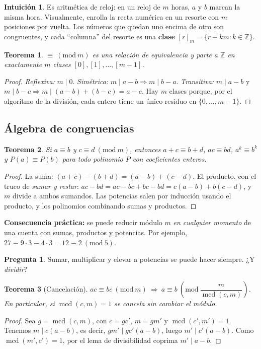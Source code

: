 \documentclass[11pt,a4paper]{article}
\newtheorem{teorema}{Teorema}[section]
\theoremstyle{definition}
\newcommand{\Z}{\mathbb{Z}}
\newcommand{\md}[1]{\ (\mathrm{mod}\ #1)}
\newcommand{\mcd}{\operatorname{mcd}}
\theoremstyle{notait}
\newtheorem*{pregunta}{Pregunta}
\theoremstyle{nota}
\newtheorem*{intuicion}{Intuición}
\begin{document}
\begin{intuicion}
Es aritmética de reloj: en un reloj de $m$ horas, $a$ y $b$ marcan la misma hora. Visualmente, enrolla la recta numérica en un resorte con $m$ posiciones por vuelta. Los números que quedan uno encima de otro son congruentes, y cada ``columna'' del resorte es una \textbf{clase} $[r]_m=\{r+km : k\in\Z\}$.
\end{intuicion}

\begin{teorema}
$\equiv\md m$ es una relación de equivalencia y parte a $\Z$ en exactamente $m$ clases $[0],[1],\dots,[m-1]$.
\end{teorema}
\begin{proof}
\emph{Reflexiva:} $m\mid 0$. \emph{Simétrica:} $m\mid a-b\Rightarrow m\mid b-a$. \emph{Transitiva:} $m\mid a-b$ y $m\mid b-c\Rightarrow m\mid(a-b)+(b-c)=a-c$. Hay $m$ clases porque, por el algoritmo de la división, cada entero tiene un único residuo en $\{0,\dots,m-1\}$.
\end{proof}

\subsection{Álgebra de congruencias}

\begin{teorema}
Si $a\equiv b$ y $c\equiv d\md m$, entonces $a+c\equiv b+d$, $ac\equiv bd$, $a^k\equiv b^k$ y $P(a)\equiv P(b)$ para todo polinomio $P$ con coeficientes enteros.
\end{teorema}
\begin{proof}
La suma: $(a+c)-(b+d)=(a-b)+(c-d)$. El producto, con el truco de \emph{sumar y restar}: $ac-bd=ac-bc+bc-bd=c(a-b)+b(c-d)$, y $m$ divide a ambos sumandos. Las potencias salen por inducción usando el producto, y los polinomios combinando sumas y productos.
\end{proof}

\textbf{Consecuencia práctica:} se puede reducir módulo $m$ \emph{en cualquier momento} de una cuenta con sumas, productos y potencias. Por ejemplo, $27\equiv 9\cdot3\equiv 4\cdot 3=12\equiv 2\md 5$.

\begin{pregunta}
Sumar, multiplicar y elevar a potencias se puede hacer siempre. ¿Y \emph{dividir}?
\end{pregunta}

\begin{teorema}[Cancelación]
$ac\equiv bc\md m\ \Longrightarrow\ a\equiv b\md{\dfrac{m}{\mcd(c,m)}}$. En particular, si $\mcd(c,m)=1$ se cancela sin cambiar el módulo.
\end{teorema}
\begin{proof}
Sea $g=\mcd(c,m)$, con $c=gc'$, $m=gm'$ y $\mcd(c',m')=1$. Tenemos $m\mid c(a-b)$, es decir, $gm'\mid gc'(a-b)$, luego $m'\mid c'(a-b)$. Como $\mcd(m',c')=1$, por el lema de divisibilidad coprima $m'\mid a-b$.
\end{proof}
\end{document}
